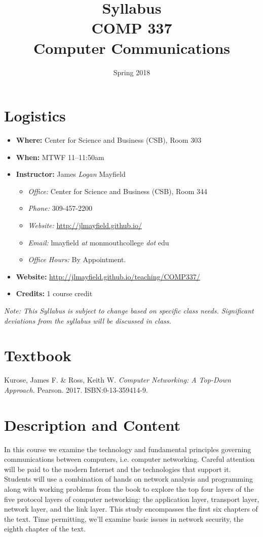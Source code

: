 \documentclass[10pt]{article}
\title{Syllabus \\ COMP 337 \\ Computer Communications}
\author{  }
\date{Spring 2018}
\begin{document}
\maketitle

\section{Logistics}
\begin{itemize}
\item \textbf{Where: }Center for Science and Business (CSB), Room 303
\item \textbf{When: } MTWF 11--11:50am
\item \textbf{Instructor: } James \textit{Logan} Mayfield
\begin{itemize}
\item \textit{Office: } Center for Science and Business (CSB), Room 344
\item \textit{Phone: } 309-457-2200 %
\item \textit{Website: } \url{http://jlmayfield.github.io/}
\item \textit{Email: } lmayfield \textit{at} monmouthcollege \textit{dot} edu
\item \textit{Office Hours: }  By Appointment.
\end{itemize}
\item \textbf{Website: } \url{http://jlmayfield.github.io/teaching/COMP337/}
\item \textbf{Credits: } 1 course credit
\end{itemize}
\emph{Note: This Syllabus is subject to change based on specific class needs. Significant deviations from the syllabus will be discussed in class.}

\section{Textbook}

\noindent
Kurose, James F. \& Ross, Keith W. \textit{Computer Networking: A Top-Down Approach.} Pearson. 2017. ISBN:0-13-359414-9. %


\section{Description and Content}

In this course we examine the technology and fundamental principles governing communications between computers, i.e. computer networking. Careful attention will be paid to the modern Internet and the technologies that support it.  Students will use a combination of hands on network analysis and programming along with working problems from the book to explore the top four layers of the five protocol layers of computer networking: the application layer, transport layer, network layer, and the link layer. This study encompasses the first six chapters of the text. Time permitting, we'll examine basic issues in network security, the eighth chapter of the text.
\end{document}
